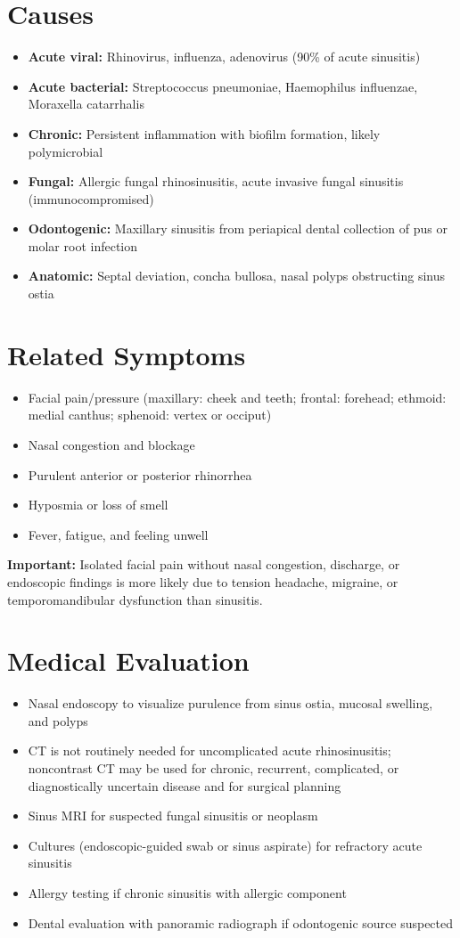 \section*{Causes}
\begin{itemize}
  \item \textbf{Acute viral:} Rhinovirus, influenza, adenovirus (90\% of acute sinusitis)
  \item \textbf{Acute bacterial:} Streptococcus pneumoniae, Haemophilus influenzae, Moraxella catarrhalis
  \item \textbf{Chronic:} Persistent inflammation with biofilm formation, likely polymicrobial
  \item \textbf{Fungal:} Allergic fungal rhinosinusitis, acute invasive fungal sinusitis (immunocompromised)
  \item \textbf{Odontogenic:} Maxillary sinusitis from periapical dental collection of pus or molar root infection
  \item \textbf{Anatomic:} Septal deviation, concha bullosa, nasal polyps obstructing sinus ostia
\end{itemize}

\section*{Related Symptoms}
\begin{itemize}
  \item Facial pain/pressure (maxillary: cheek and teeth; frontal: forehead; ethmoid: medial canthus; sphenoid: vertex or occiput)
  \item Nasal congestion and blockage
  \item Purulent anterior or posterior rhinorrhea
  \item Hyposmia or loss of smell
  \item Fever, fatigue, and feeling unwell
\end{itemize}
\textbf{Important:} Isolated facial pain without nasal congestion, discharge, or endoscopic findings is more likely due to tension headache, migraine, or temporomandibular dysfunction than sinusitis.

\section*{Medical Evaluation}
\begin{itemize}
  \item Nasal endoscopy to visualize purulence from sinus ostia, mucosal swelling, and polyps
  \item CT is not routinely needed for uncomplicated acute rhinosinusitis; noncontrast CT may be used for chronic, recurrent, complicated, or diagnostically uncertain disease and for surgical planning
  \item Sinus MRI for suspected fungal sinusitis or neoplasm
  \item Cultures (endoscopic-guided swab or sinus aspirate) for refractory acute sinusitis
  \item Allergy testing if chronic sinusitis with allergic component
  \item Dental evaluation with panoramic radiograph if odontogenic source suspected
\end{itemize}

